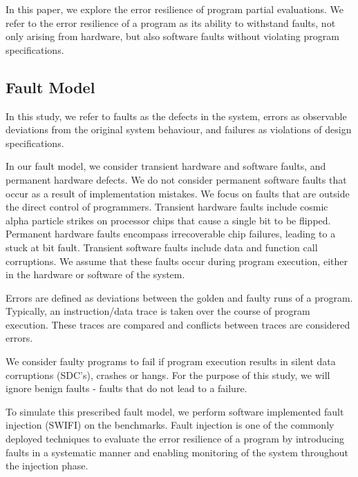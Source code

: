 In this paper, we explore the error resilience of program partial evaluations. We refer to the error resilience of a program as its ability to withstand faults, not only arising from hardware, but also software faults without violating program specifications. 

\subsection{Fault Model}
\label{sec:fault_model}

In this study, we refer to faults as the defects in the system, errors as observable deviations from the original system behaviour, and failures as violations of design specifications.

In our fault model, we consider transient hardware and software faults, and permanent hardware defects.
We do not consider permanent software faults that occur as a result of implementation mistakes.
We focus on faults that are outside the direct control of programmers.
Transient hardware faults include cosmic alpha particle strikes on processor chips that cause a single bit to be flipped.
Permanent hardware faults encompass irrecoverable chip failures, leading to a stuck at bit fault.
Transient software faults include data and function call corruptions. 
We assume that these faults occur during program execution, either in the hardware or software of the system. 

Errors are defined as deviations between the golden and faulty runs of a program.
Typically, an instruction/data trace is taken over the course of program execution. 
These traces are compared and conflicts between traces are considered errors.

We consider faulty programs to fail if program execution results in silent data corruptions (SDC's), crashes or hangs. For the purpose of this study, we will ignore benign faults - faults that do not lead to a failure.

To simulate this prescribed fault model, we perform software implemented fault injection (SWIFI) on the benchmarks.  
Fault injection is one of the commonly deployed techniques to evaluate the error resilience of a program by introducing faults in a systematic manner and enabling monitoring of the system throughout the injection phase.
